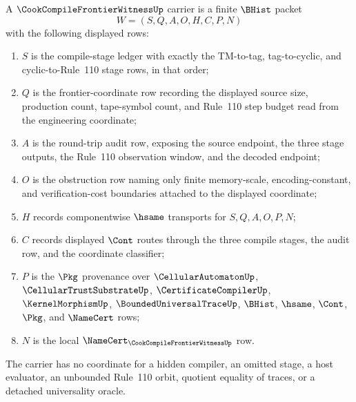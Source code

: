 \begin{definition}
\label{def:cook-compile-frontier-witness-carrier}
A $\CookCompileFrontierWitnessUp$ carrier is a finite $\BHist$ packet
$$
W=(S,Q,A,O,H,C,P,N)
$$
with the following displayed rows:
\begin{enumerate}
\item $S$ is the compile-stage ledger with exactly the TM-to-tag, tag-to-cyclic, and cyclic-to-Rule~110 stage rows, in that order;
\item $Q$ is the frontier-coordinate row recording the displayed source size, production count, tape-symbol count, and Rule~110 step budget read from the engineering coordinate;
\item $A$ is the round-trip audit row, exposing the source endpoint, the three stage outputs, the Rule~110 observation window, and the decoded endpoint;
\item $O$ is the obstruction row naming only finite memory-scale, encoding-constant, and verification-cost boundaries attached to the displayed coordinate;
\item $H$ records componentwise $\hsame$ transports for $S,Q,A,O,P,N$;
\item $C$ records displayed $\Cont$ routes through the three compile stages, the audit row, and the coordinate classifier;
\item $P$ is the $\Pkg$ provenance over $\CellularAutomatonUp$, $\CellularTrustSubstrateUp$, $\CertificateCompilerUp$, $\KernelMorphismUp$, $\BoundedUniversalTraceUp$, $\BHist$, $\hsame$, $\Cont$, $\Pkg$, and $\NameCert$ rows;
\item $N$ is the local $\NameCert_{\CookCompileFrontierWitnessUp}$ row.
\end{enumerate}
The carrier has no coordinate for a hidden compiler, an omitted stage, a host evaluator, an unbounded Rule~110 orbit, quotient equality of traces, or a detached universality oracle.
\end{definition}

